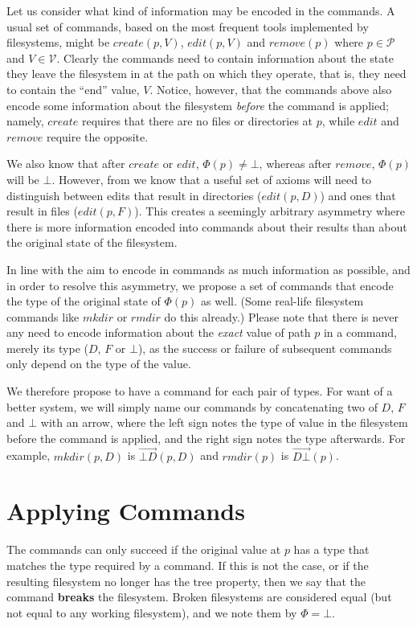 \documentclass[12pt]{article}
\newcommand{\setv}{\mathcal{V}}
\newcommand{\setp}{\mathcal{P}}
\newcommand{\empt}{\bot}
\newcommand{\FS}{\Phi} %
\newcommand{\cbd}{\overrightarrow{\empt{D}}}
\newcommand{\cdb}{\overrightarrow{D\empt}}
\begin{document}
Let us consider what kind of information may be encoded in the commands.
A usual set of commands, based on the most frequent tools implemented by filesystems,
might be $create(p,V)$, $edit(p,V)$ and $remove(p)$ where $p\in\setp$ and $V\in\setv$.
Clearly the commands need to contain information about the state they leave the filesystem
in at the path on which they operate, that is, they need to contain the ``end'' value, $V$.
Notice, however, that the commands above also encode some information about the filesystem
{\it before} the command is applied; namely, $create$ requires that there are no files
or directories at $p$, while $edit$ and $remove$ require the opposite.

We also know that after $create$ or $edit$, $\FS(p)\neq\empt$, whereas after $remove$,
$\FS(p)$ will be $\empt$. However, from \cite{NREC:alg} we know that a useful set of axioms
will need to distinguish between edits that result in directories ($edit(p,D)$) and
ones that result in files ($edit(p,F)$). This creates a seemingly arbitrary asymmetry where
there is more information encoded into commands about their results than about the
original state of the filesystem.

In line with the aim to encode in commands as much information as possible,
and in order to resolve this asymmetry, we propose a set of commands that encode
the type of the original state of $\FS(p)$ as well.
(Some real-life filesystem commands like $mkdir$ or $rmdir$ do this already.)
Please note that there is never any need to encode information about the
{\it exact} value of path $p$ in a command, merely its type ($D$, $F$ or $\empt$),
as the success or failure of subsequent commands only depend on the type of the value.

We therefore propose to have a command for each pair of types.
For want of a better system, we will simply name our commands by concatenating
two of $D$, $F$ and $\empt$ with an arrow, where the left sign notes the type of value
in the filesystem before the command is applied, and the right sign notes the type
afterwards. For example, $mkdir(p,D)$ is $\cbd(p,D)$ and $rmdir(p)$ is $\cdb(p)$.


\section{Applying Commands}

The commands can only succeed if the original value at $p$ has a type that matches
the type required by a command. If this is not the case, or if the resulting
filesystem no longer has the tree property, then we say that the command
\textbf{breaks} the filesystem. Broken filesystems are considered equal
(but not equal to any working filesystem), and we note them by $\FS=\empt$.
\end{document}
